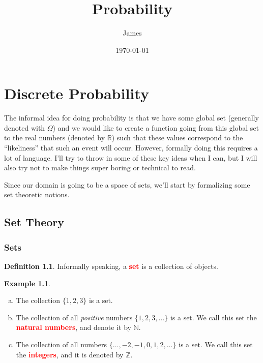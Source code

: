 \documentclass{book}
\title{Probability}
\author{James}
\date{\today}
\theoremstyle{definition}
\numberwithin{problem}{chapter}
\numberwithin{solution}{chapter}
\numberwithin{theorem}{chapter}
\newtheorem{definition}{Definition}
\numberwithin{definition}{chapter}
\newtheorem{example}{Example}
\numberwithin{example}{chapter}
\numberwithin{remark}{chapter}
\numberwithin{claim}{chapter}
\numberwithin{fact}{chapter}
\numberwithin{preliminary}{chapter}
\numberwithin{corollary}{theorem}
\numberwithin{lemma}{chapter}
\numberwithin{proposition}{chapter}
\newcommand{\deff}[1]{\textbf{\textcolor{red}{#1}}}
\begin{document}
\maketitle

\tableofcontents

\newpage

\chapter{Discrete Probability}

The informal idea for doing probability is that we have some global set (generally denoted with $\Omega$) and we would like to create a function going from this global set to the real numbers (denoted by $\mathbb{R}$) such that these values correspond to the ``likeliness'' that such an event will occur. However, formally doing this requires a lot of language. I'll try to throw in some of these key ideas when I can, but I will also try not to make things super boring or technical to read.

Since our domain is going to be a space of sets, we'll start by formalizing some set theoretic notions.

\section{Set Theory}

\subsection{Sets} 

\begin{definition} 
Informally speaking, a \deff{set} is a collection of objects.
\end{definition}

\begin{example} \label{ex:1}
\begin{enumerate}[(a)]
    \item The collection $\{1,2,3\}$ is a set. 
    \item The collection of all \textit{positive} numbers $\{1,2,3, \ldots\}$ is a set. We call this set the \deff{natural numbers}, and denote it by $\mathbb{N}$.
    \item The collection of all numbers $\{\ldots,-2,-1,0,1,2,\ldots\}$ is a set. We call this set the \deff{integers}, and it is denoted by $\mathbb{Z}$.
\end{enumerate}
\end{example}
\end{document}
